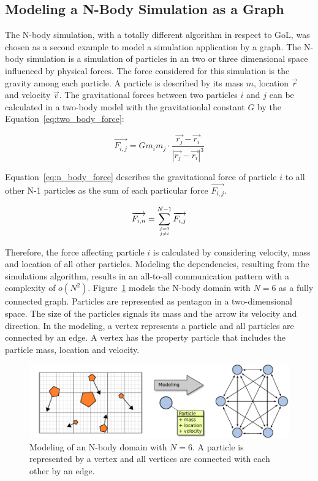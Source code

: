 \subsection{Modeling a N-Body Simulation as a Graph}
\label{sec:design:nbody}
The N-body simulation, with a totally different algorithm in respect to GoL, was chosen as a
second example to model a simulation application by a graph.  The
N-body simulation is a simulation of particles in an two or three
dimensional space influenced by physical forces. The force considered
for this simulation is the gravity among each particle.
A particle is described by its mass $m$, location $\overrightarrow{r}$
and velocity $\overrightarrow{v}$.  The gravitational forces between
two particles $i$ and $j$ can be calculated in a two-body model with
the gravitationlal constant $G$ by the
Equation~\ref{eq:two_body_force}:

\begin{equation}
  \label{eq:two_body_force}
  \overrightarrow{F_{i,j}} = G  m_i  m_j \cdot \frac{\overrightarrow{r_j} - \overrightarrow{r_i}}{|\overrightarrow{r_j} - \overrightarrow{r_i}|^3}
\end{equation}

\noindent Equation~\ref{eq:n_body_force} describes the gravitational force of
particle $i$ to all other N-1 particles as the sum of each particular
force $\overrightarrow{F_{i,j}}$.

\begin{equation}
  \label{eq:n_body_force}
  \overrightarrow{F_{i,n}} = \sum_{j = 0 \atop j \neq i}^{N-1} \overrightarrow{F_{i,j}}
\end{equation}

\noindent Therefore, the force affecting particle $i$ is calculated by
considering velocity, mass and location of all other
particles. Modeling the dependencies, resulting from the simulations
algorithm, results in an all-to-all communication pattern with a
complexity of $o(N^2)$. Figure~\ref{fig:nbody_modeling} models the
N-body domain with $N = 6$ as a fully connected graph. Particles are
represented as pentagon in a two-dimensional space. The size of the
particles signals its mass and the arrow its velocity and direction.
In the modeling, a vertex represents a particle and all particles are
connected by an edge. A vertex has the property particle that includes
the particle mass, location and velocity.

\begin{figure}[H]
  \centering \includegraphics[width=\textwidth]{graphics/30_nbody_modeling}
  \caption{Modeling of an N-body domain with $N = 6$. A particle is
    represented by a vertex and all vertices are connected with each
    other by an edge.}
  \label{fig:nbody_modeling}
\end{figure}

